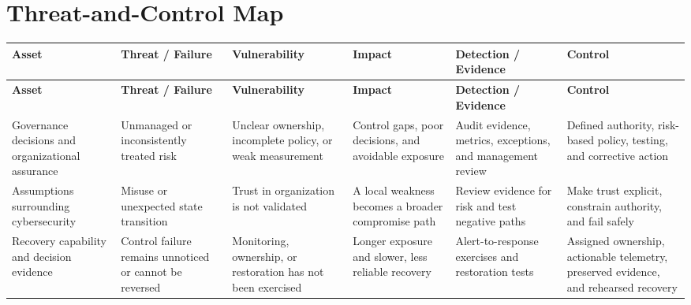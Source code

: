 \documentclass[11pt]{article}
\begin{document}
\section*{Threat-and-Control Map}
\begingroup\scriptsize\setlength{\tabcolsep}{2pt}
\begin{longtable}{>{\RaggedRight\arraybackslash}p{}>{\RaggedRight\arraybackslash}p{}>{\RaggedRight\arraybackslash}p{}>{\RaggedRight\arraybackslash}p{}>{\RaggedRight\arraybackslash}p{}>{\RaggedRight\arraybackslash}p{}}
\toprule\rowcolor{Navy}\color{white}\textbf{Asset} & \color{white}\textbf{Threat / Failure} & \color{white}\textbf{Vulnerability} & \color{white}\textbf{Impact} & \color{white}\textbf{Detection / Evidence} & \color{white}\textbf{Control}\\\midrule
\endfirsthead
\toprule\rowcolor{Navy}\color{white}\textbf{Asset} & \color{white}\textbf{Threat / Failure} & \color{white}\textbf{Vulnerability} & \color{white}\textbf{Impact} & \color{white}\textbf{Detection / Evidence} & \color{white}\textbf{Control}\\\midrule
\endhead
Governance decisions and organizational assurance & Unmanaged or inconsistently treated risk & Unclear ownership, incomplete policy, or weak measurement & Control gaps, poor decisions, and avoidable exposure & Audit evidence, metrics, exceptions, and management review & Defined authority, risk-based policy, testing, and corrective action\\\midrule
Assumptions surrounding cybersecurity & Misuse or unexpected state transition & Trust in organization is not validated & A local weakness becomes a broader compromise path & Review evidence for risk and test negative paths & Make trust explicit, constrain authority, and fail safely\\\midrule
Recovery capability and decision evidence & Control failure remains unnoticed or cannot be reversed & Monitoring, ownership, or restoration has not been exercised & Longer exposure and slower, less reliable recovery & Alert-to-response exercises and restoration tests & Assigned ownership, actionable telemetry, preserved evidence, and rehearsed recovery\\\midrule
\bottomrule
\end{longtable}
\endgroup
\end{document}

